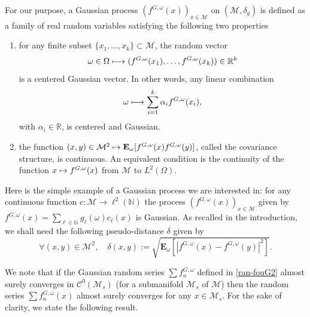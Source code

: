 \documentclass[JEP,XML,SOM,Unicode,NoEqCountersInSection,published]{cedram}
\def\mto{\mathchoice{\longmapsto}{\mapsto}{\mapsto}{\mapsto}}
\newenvironment{enumeratei}
{\bgroup\def\theenumi{\roman{enumi}}\def\theenumii{\arabic{enumii}}\begin{enumerate}}
{\end{enumerate}\egroup}
\theoremstyle{theorem}
\theoremstyle{definition}
\newcommand\R{\mathbb{R}}
\newcommand\E{\mathbf{E}}
\newcommand\N{\mathbb{N}}
\newcommand\CC{\mathcal{C}}
\begin{document}
For our purpose, a Gaussian process $(f^{G,\omega}(x))_{x\in \mathcal{M}}$ on $(\mathcal{M},\delta_g)$ is defined as a family of real random variables satisfying the following two properties
\begin{enumeratei}
\item for any finite subset $\{x_1,\dots,x_k\}\subset \mathcal{M}$, the random vector
\begin{equation*}\omega\in\Omega\mto (f^{G,\omega}(x_1),\dots,f^{G,\omega}(x_k))\in \R^k \end{equation*}
is a centered Gaussian vector. In other words, any linear combination
\[
\omega\mto \sum_{i=1}^k\alpha_i f^{G,\omega}(x_i),
\]
with $\alpha_i\in \R$, is centered and Gaussian.
\item the function $(x,y)\in \mathcal{M}^2\mto \E_{\omega}[f^{G,\omega}(x)f^{G,\omega}(y)]$, called the covariance structure, is continuous. An equivalent condition is the continuity of the function $x\mto f^{G,\omega}(x)$ from $\mathcal{M}$ to $L^2(\Omega)$.
\end{enumeratei}

Here is the simple example of a Gaussian process we are interested in: for any
continuous function $c:\mathcal{M}\to \ell^2(\N)$ the process $(f^{G,\omega}(x))_{x\in \mathcal{M}}$ given by $f^{G,\omega}(x)=\sum_{\ell\in \N} g_\ell(\omega) c_\ell(x)$ is Gaussian.
As recalled in the introduction, we shall need the following pseudo-distance $\delta$ given by
\begin{equation*}
\forall (x,y)\in \mathcal{M}^2, \quad \delta(x,y):=\sqrt{\E_{\omega}[|f^{G,\omega}(x)-f^{G,\omega}(y)|^2]}.
\end{equation*}

We note that if the Gaussian random series $\sum f_n^{G,\omega}$ defined in \eqref{ran-fouG2} almost surely converges in $\CC^0(\mathcal{M}_s)$ (for a submanifold $\mathcal{M}_s$ of $\mathcal{M}$) then the random series $\sum f_n^{G,\omega}(x)$ almost surely converges for any $x\in \mathcal{M}_s$.
For the sake of clarity, we state the following result.
\end{document}
